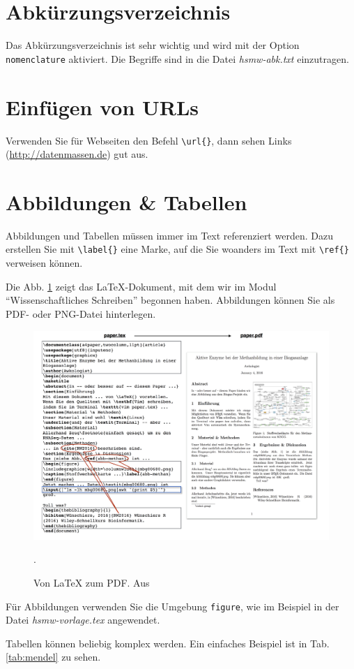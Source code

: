 \documentclass[nomenclature, norefpage, oneside, glossary, hypertext,multiauthor]{hsmw-class}
\begin{document}
\section{Abkürzungsverzeichnis}
Das Abkürzungsverzeichnis ist sehr wichtig und wird mit der Option \texttt{nomenclature} aktiviert. Die Begriffe sind in die Datei \textit{hsmw-abk.txt} einzutragen.


\section{Einfügen von URLs}
Verwenden Sie für Webseiten den Befehl \verb+\url{}+, dann sehen Links (\url{http://datenmassen.de}) gut aus.

\section{Abbildungen \& Tabellen} \label{sec-abb}
Abbildungen und Tabellen müssen immer im Text referenziert werden. Dazu erstellen Sie mit \verb+\label{}+ eine Marke, auf die Sie woanders im Text mit \verb+\ref{}+ verweisen können.

Die Abb. \ref{fig:latex} zeigt das \LaTeX{}-Dokument, mit dem wir im Modul \enquote{Wissenschaftliches Schreiben} begonnen haben. Abbildungen können Sie als PDF- oder PNG-Datei hinterlegen.

\begin{figure}[h]
    \centering
    \includegraphics[width=.7\columnwidth]{fig-latex.png}
    \caption{Von \LaTeX{} zum PDF. Aus \citep{Wuenschiers2016}}.
    \label{fig:latex}
\end{figure}

Für Abbildungen verwenden Sie die Umgebung \texttt{figure}, wie im Beispiel in der Datei \textit{hsmw-vorlage.tex} angewendet. 

Tabellen können beliebig komplex werden. Ein einfaches Beispiel ist in Tab. \ref{tab:mendel} zu sehen.
\end{document}
